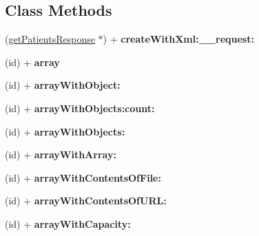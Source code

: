 \subsection*{Class Methods}
\begin{DoxyCompactItemize}
\item 
\hypertarget{interfaceget_patients_response_ad4daa532a648feebc0986a168ce5139f}{}(\hyperlink{interfaceget_patients_response}{get\+Patients\+Response} $\ast$) + {\bfseries create\+With\+Xml\+:\+\_\+\+\_\+request\+:}\label{interfaceget_patients_response_ad4daa532a648feebc0986a168ce5139f}

\item 
\hypertarget{interfaceget_patients_response_ab5ad254910d595137675b0424d2adaca}{}(id) + {\bfseries array}\label{interfaceget_patients_response_ab5ad254910d595137675b0424d2adaca}

\item 
\hypertarget{interfaceget_patients_response_ad61535d61f6724c1ed6f79945d90a2fd}{}(id) + {\bfseries array\+With\+Object\+:}\label{interfaceget_patients_response_ad61535d61f6724c1ed6f79945d90a2fd}

\item 
\hypertarget{interfaceget_patients_response_a214618c80daab89f17bfec9b90b37ed4}{}(id) + {\bfseries array\+With\+Objects\+:count\+:}\label{interfaceget_patients_response_a214618c80daab89f17bfec9b90b37ed4}

\item 
\hypertarget{interfaceget_patients_response_a1b77f137988e5721110fdd6343149dde}{}(id) + {\bfseries array\+With\+Objects\+:}\label{interfaceget_patients_response_a1b77f137988e5721110fdd6343149dde}

\item 
\hypertarget{interfaceget_patients_response_a37aa65456471b5f73fa904dde42151ae}{}(id) + {\bfseries array\+With\+Array\+:}\label{interfaceget_patients_response_a37aa65456471b5f73fa904dde42151ae}

\item 
\hypertarget{interfaceget_patients_response_a1b54b35693a5d0e78329e030d13b32d3}{}(id) + {\bfseries array\+With\+Contents\+Of\+File\+:}\label{interfaceget_patients_response_a1b54b35693a5d0e78329e030d13b32d3}

\item 
\hypertarget{interfaceget_patients_response_ad8ed6ede205c1337e3c93dfacca0213b}{}(id) + {\bfseries array\+With\+Contents\+Of\+U\+R\+L\+:}\label{interfaceget_patients_response_ad8ed6ede205c1337e3c93dfacca0213b}

\item 
\hypertarget{interfaceget_patients_response_abe01f1a33e99679151915f7a8f9b1989}{}(id) + {\bfseries array\+With\+Capacity\+:}\label{interfaceget_patients_response_abe01f1a33e99679151915f7a8f9b1989}

\end{DoxyCompactItemize}
